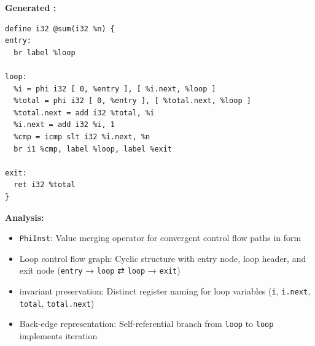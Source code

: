 \textbf{Generated  :}
\begin{lstlisting}[style=ir]
define i32 @sum(i32 %n) {
entry:
  br label %loop

loop:
  %i = phi i32 [ 0, %entry ], [ %i.next, %loop ]
  %total = phi i32 [ 0, %entry ], [ %total.next, %loop ]
  %total.next = add i32 %total, %i
  %i.next = add i32 %i, 1
  %cmp = icmp slt i32 %i.next, %n
  br i1 %cmp, label %loop, label %exit

exit:
  ret i32 %total
}
\end{lstlisting}

\textbf{Analysis:}
\begin{itemize}[noitemsep]
  \item \texttt{PhiInst}: Value merging operator for convergent control flow paths in  form
  \item Loop control flow graph: Cyclic structure with entry node, loop header, and exit node (\texttt{entry} → \texttt{loop} ⇄ \texttt{loop} → \texttt{exit})
  \item {} invariant preservation: Distinct register naming for loop variables (\texttt{i}, \texttt{i.next}, \texttt{total}, \texttt{total.next})
  \item Back-edge representation: Self-referential branch from \texttt{loop} to \texttt{loop} implements iteration
\end{itemize}

